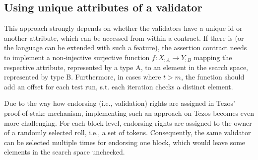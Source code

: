 \subsection{Using unique attributes of a validator}\label{sec:alt_attributes}
This approach strongly depends on whether the validators have a unique id or another attribute, which can be accessed from within a contract. If there is (or the language can be extended with such a feature), the assertion contract needs to implement a non-injective surjective function $f: X_{:A} \rightarrow Y_{:B}$ mapping the respective attribute, represented by a type A, to an element in the search space, represented by type B. Furthermore, in cases where $t > m$, the function should add an offset for each test run, s.t. each iteration checks a distinct element.

Due to the way how endorsing (i.e., validation) rights are assigned in Tezos' proof-of-stake mechanism, implementing such an approach on Tezos becomes even more challenging. For each block level, endorsing rights are assigned to the owner of a randomly selected roll, i.e., a set of tokens. Consequently, the same validator can be selected multiple times for endorsing one block, which would leave some elements in the search space unchecked.